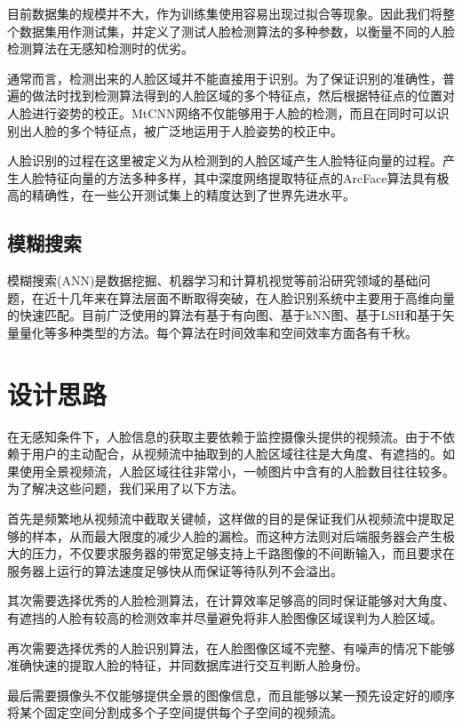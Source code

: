 目前数据集的规模并不大，作为训练集使用容易出现过拟合等现象。因此我们将整个数据集用作测试集，并定义了测试人脸检测算法的多种参数，以衡量不同的人脸检测算法在无感知检测时的优劣。

通常而言，检测出来的人脸区域并不能直接用于识别。为了保证识别的准确性，普遍的做法时找到检测算法得到的人脸区域的多个特征点，然后根据特征点的位置对人脸进行姿势的校正。MtCNN网络\cite{zhang2016joint}不仅能够用于人脸的检测，而且在同时可以识别出人脸的多个特征点，被广泛地运用于人脸姿势的校正中。

人脸识别的过程在这里被定义为从检测到的人脸区域产生人脸特征向量的过程。产生人脸特征向量的方法多种多样，其中深度网络提取特征点的ArcFace算法\cite{deng2018arcface}具有极高的精确性，在一些公开测试集上的精度达到了世界先进水平。

\subsection{模糊搜索}

模糊搜索(ANN)是数据挖掘、机器学习和计算机视觉等前沿研究领域的基础问题，在近十几年来在算法层面不断取得突破，在人脸识别系统中主要用于高维向量的快速匹配。目前广泛使用的算法有基于有向图、基于kNN图、基于LSH和基于矢量量化等多种类型的方法。每个算法在时间效率和空间效率方面各有千秋。

\section{设计思路}

在无感知条件下，人脸信息的获取主要依赖于监控摄像头提供的视频流。由于不依赖于用户的主动配合，从视频流中抽取到的人脸区域往往是大角度、有遮挡的。如果使用全景视频流，人脸区域往往非常小，一帧图片中含有的人脸数目往往较多。为了解决这些问题，我们采用了以下方法。

首先是频繁地从视频流中截取关键帧，这样做的目的是保证我们从视频流中提取足够的样本，从而最大限度的减少人脸的漏检。而这种方法则对后端服务器会产生极大的压力，不仅要求服务器的带宽足够支持上千路图像的不间断输入，而且要求在服务器上运行的算法速度足够快从而保证等待队列不会溢出。

其次需要选择优秀的人脸检测算法，在计算效率足够高的同时保证能够对大角度、有遮挡的人脸有较高的检测效率并尽量避免将非人脸图像区域误判为人脸区域。

再次需要选择优秀的人脸识别算法，在人脸图像区域不完整、有噪声的情况下能够准确快速的提取人脸的特征，并同数据库进行交互判断人脸身份。

最后需要摄像头不仅能够提供全景的图像信息，而且能够以某一预先设定好的顺序将某个固定空间分割成多个子空间提供每个子空间的视频流。

